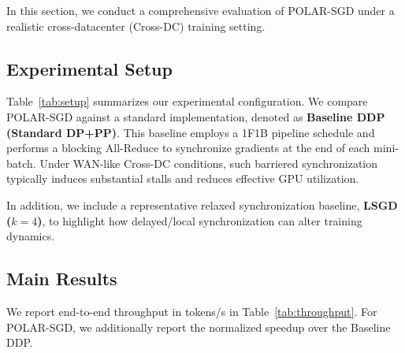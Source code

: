 \label{sec:evaluation}

In this section, we conduct a comprehensive evaluation of POLAR-SGD under a realistic cross-datacenter (Cross-DC) training setting. 

\subsection{Experimental Setup}
\label{sec:setup}

Table~\ref{tab:setup} summarizes our experimental configuration. We compare POLAR-SGD against a standard implementation, denoted as \textbf{Baseline DDP (Standard DP+PP)}. This baseline employs a 1F1B pipeline schedule and performs a blocking All-Reduce to synchronize gradients at the end of each mini-batch. Under WAN-like Cross-DC conditions, such barriered synchronization typically induces substantial stalls and reduces effective GPU utilization.

In addition, we include a representative relaxed synchronization baseline, \textbf{LSGD ($k=4$)}, to highlight how delayed/local synchronization can alter training dynamics.

\subsection{Main Results}

We report end-to-end throughput in tokens/s in Table~\ref{tab:throughput}. For POLAR-SGD, we additionally report the normalized speedup over the Baseline DDP. 

